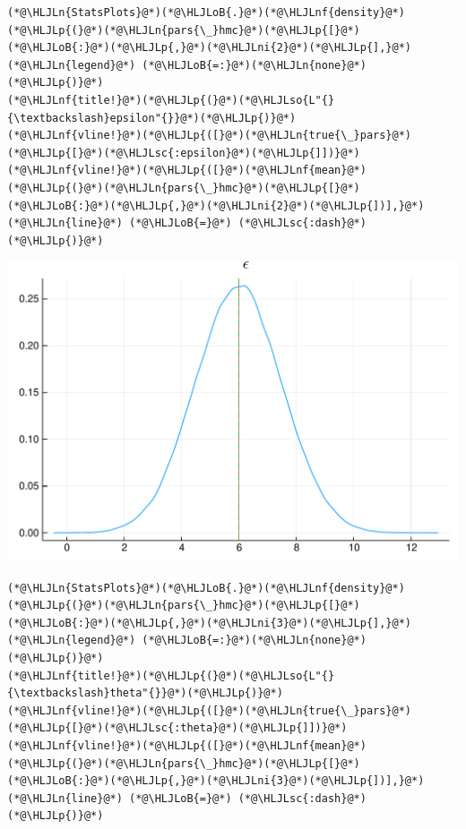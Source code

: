 \documentclass[12pt,a4paper]{article}
\newcommand{\HLJLn}[1]{#1}
\newcommand{\HLJLnf}[1]{\textcolor[RGB]{66,102,213}{#1}}
\newcommand{\HLJLsc}[1]{\textcolor[RGB]{201,61,57}{#1}}
\newcommand{\HLJLso}[1]{\textcolor[RGB]{201,61,57}{#1}}
\newcommand{\HLJLni}[1]{\textcolor[RGB]{59,151,46}{#1}}
\newcommand{\HLJLoB}[1]{\textcolor[RGB]{102,102,102}{\textbf{#1}}}
\newcommand{\HLJLp}[1]{#1}
\begin{document}
\begin{lstlisting}
(*@\HLJLn{StatsPlots}@*)(*@\HLJLoB{.}@*)(*@\HLJLnf{density}@*)(*@\HLJLp{(}@*)(*@\HLJLn{pars{\_}hmc}@*)(*@\HLJLp{[}@*)(*@\HLJLoB{:}@*)(*@\HLJLp{,}@*)(*@\HLJLni{2}@*)(*@\HLJLp{],}@*) (*@\HLJLn{legend}@*) (*@\HLJLoB{=:}@*)(*@\HLJLn{none}@*)(*@\HLJLp{)}@*)
(*@\HLJLnf{title!}@*)(*@\HLJLp{(}@*)(*@\HLJLso{L"{}{\textbackslash}epsilon"{}}@*)(*@\HLJLp{)}@*)
(*@\HLJLnf{vline!}@*)(*@\HLJLp{([}@*)(*@\HLJLn{true{\_}pars}@*)(*@\HLJLp{[}@*)(*@\HLJLsc{:epsilon}@*)(*@\HLJLp{]])}@*)
(*@\HLJLnf{vline!}@*)(*@\HLJLp{([}@*)(*@\HLJLnf{mean}@*)(*@\HLJLp{(}@*)(*@\HLJLn{pars{\_}hmc}@*)(*@\HLJLp{[}@*)(*@\HLJLoB{:}@*)(*@\HLJLp{,}@*)(*@\HLJLni{2}@*)(*@\HLJLp{])],}@*) (*@\HLJLn{line}@*) (*@\HLJLoB{=}@*) (*@\HLJLsc{:dash}@*)(*@\HLJLp{)}@*)
\end{lstlisting}

\includegraphics[width=\linewidth]{figures/dsge_and_julia_36_1.pdf}

\begin{lstlisting}
(*@\HLJLn{StatsPlots}@*)(*@\HLJLoB{.}@*)(*@\HLJLnf{density}@*)(*@\HLJLp{(}@*)(*@\HLJLn{pars{\_}hmc}@*)(*@\HLJLp{[}@*)(*@\HLJLoB{:}@*)(*@\HLJLp{,}@*)(*@\HLJLni{3}@*)(*@\HLJLp{],}@*) (*@\HLJLn{legend}@*) (*@\HLJLoB{=:}@*)(*@\HLJLn{none}@*)(*@\HLJLp{)}@*)
(*@\HLJLnf{title!}@*)(*@\HLJLp{(}@*)(*@\HLJLso{L"{}{\textbackslash}theta"{}}@*)(*@\HLJLp{)}@*)
(*@\HLJLnf{vline!}@*)(*@\HLJLp{([}@*)(*@\HLJLn{true{\_}pars}@*)(*@\HLJLp{[}@*)(*@\HLJLsc{:theta}@*)(*@\HLJLp{]])}@*)
(*@\HLJLnf{vline!}@*)(*@\HLJLp{([}@*)(*@\HLJLnf{mean}@*)(*@\HLJLp{(}@*)(*@\HLJLn{pars{\_}hmc}@*)(*@\HLJLp{[}@*)(*@\HLJLoB{:}@*)(*@\HLJLp{,}@*)(*@\HLJLni{3}@*)(*@\HLJLp{])],}@*) (*@\HLJLn{line}@*) (*@\HLJLoB{=}@*) (*@\HLJLsc{:dash}@*)(*@\HLJLp{)}@*)
\end{lstlisting}
\end{document}
